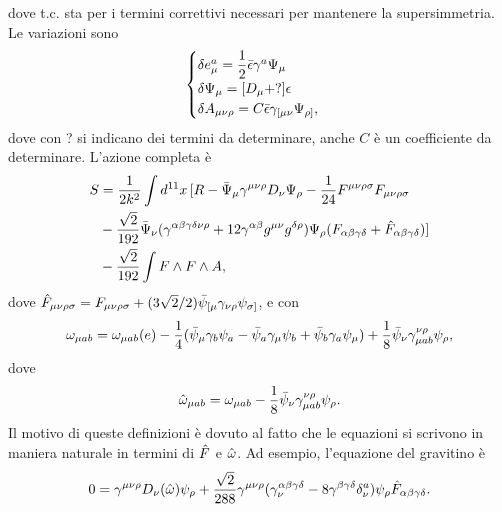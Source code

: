 dove t.c. sta per i termini correttivi necessari per mantenere la supersimmetria. Le variazioni sono 
\begin{equation}
    \begin{cases}
        \delta e^a_\mu = \dfrac{1}{2}\bar{\epsilon}\gamma^a\Psi_\mu \\
        \delta\Psi_\mu = [D_\mu + ?]\epsilon \\
        \delta A_{\mu\nu\rho} = C\bar{\epsilon}\gamma_{[\mu\nu}\Psi_{\rho]},
    \end{cases}
\end{equation}
dove con ? si indicano dei termini da determinare, anche $C$ è un coefficiente da determinare. L'azione completa è 
\begin{equation}
    \begin{split}
        S &= \frac{1}{2k^2}\int d^{11}x\,[R - \bar{\Psi}_\mu\gamma^{\mu\nu\rho}D_\nu\Psi_\rho - \frac{1}{24}F^{\mu\nu\rho\sigma}F_{\mu\nu\rho\sigma} \\
        &- \frac{\sqrt{2}}{192}\bar{\Psi}_\nu(\gamma^{\alpha\beta\gamma\delta\nu\rho} + 12\gamma^{\alpha\beta}g^{\mu\nu}g^{\delta\rho})\Psi_\rho(F_{\alpha\beta\gamma\delta} + \hat{F}_{\alpha\beta\gamma\delta})] \\
        &- \frac{\sqrt{2}}{192}\int F \wedge F \wedge A,
    \end{split}
\end{equation}
dove $\hat{F}_{\mu\nu\rho\sigma} = F_{\mu\nu\rho\sigma} + (3\sqrt{2}/2)\bar{\psi}_{[\mu}\gamma_{\nu\rho}\psi_{\sigma]}$, e con 
\begin{equation}
    \omega_{\mu ab} = \omega_{\mu ab}(e) - \frac{1}{4}(\bar{\psi}_\mu\gamma_b\psi_a - \bar{\psi}_a\gamma_\mu\psi_b + \bar{\psi}_b\gamma_a\psi_\mu) + \frac{1}{8}\bar{\psi}_\nu\gamma^{\nu\rho}_{\mu ab}\psi_\rho,
\end{equation}
dove 
\begin{equation}
    \hat{\omega}_{\mu ab} = \omega_{\mu ab} - \frac{1}{8}\bar{\psi}_\nu\gamma^{\nu\rho}_{\mu ab}\psi_\rho.
\end{equation}
Il motivo di queste definizioni è dovuto al fatto che le equazioni si scrivono in maniera naturale in termini di $\hat{F}$ e $\hat{\omega}$. Ad esempio, l'equazione del gravitino è 
\begin{equation}
    0 = \gamma^{\mu\nu\rho}D_\nu(\hat{\omega})\psi_\rho + \frac{\sqrt{2}}{288}\gamma^{\mu\nu\rho}(\gamma^{\alpha\beta\gamma\delta}_\nu - 8\gamma^{\beta\gamma\delta}\delta^a_\nu)\psi_\rho\hat{F}_{\alpha\beta\gamma\delta}.
\end{equation}
